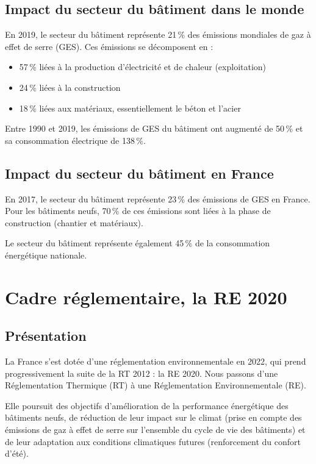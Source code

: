 \section{Impact du secteur du bâtiment dans le monde}

En 2019, le secteur du bâtiment représente 21\,\% des émissions mondiales de gaz à effet de serre (GES). Ces émissions se décomposent en :
\begin{itemize}
  \item 57\,\% liées à la production d'électricité et de chaleur (exploitation)
  \item 24\,\% liées à la construction
  \item 18\,\% liées aux matériaux, essentiellement le béton et l'acier
\end{itemize}

Entre 1990 et 2019, les émissions de GES du bâtiment ont augmenté de 50\,\% et sa consommation électrique de 138\,\%.

\section{Impact du secteur du bâtiment en France}

En 2017, le secteur du bâtiment représente 23\,\% des émissions de GES en France. Pour les bâtiments neufs, 70\,\% de ces émissions sont liées à la phase de construction (chantier et matériaux).

Le secteur du bâtiment représente également 45\,\% de la consommation énergétique nationale.

\chapter{Cadre réglementaire, la RE 2020}

\section{Présentation}

La France s'est dotée d'une réglementation environnementale en 2022, qui prend progressivement la suite de la RT 2012 : la RE 2020. Nous passons d'une Réglementation Thermique (RT) à une Réglementation Environnementale (RE).

Elle poursuit des objectifs d'amélioration de la performance énergétique des bâtiments neufs, de réduction de leur impact sur le climat (prise en compte des émissions de gaz à effet de serre sur l'ensemble du cycle de vie des bâtiments) et de leur adaptation aux conditions climatiques futures (renforcement du confort d'été).


